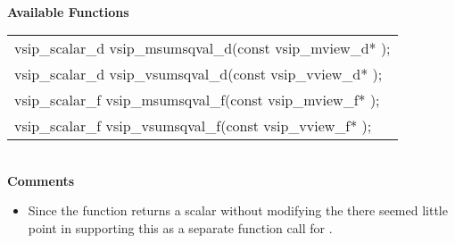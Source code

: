 \\\cvsiplh
\newline \hspace*{.8cm} \vspace*{.1cm} \textbf{Available Functions }
\newline \hspace*{1.1cm} {
\ttfamily
\begin{tabular}[H]{l}
vsip\_scalar\_d vsip\_msumsqval\_d(const vsip\_mview\_d* );\\
vsip\_scalar\_d vsip\_vsumsqval\_d(const vsip\_vview\_d* );\\
vsip\_scalar\_f vsip\_msumsqval\_f(const vsip\_mview\_f* );\\
vsip\_scalar\_f vsip\_vsumsqval\_f(const vsip\_vview\_f* );\\
\end{tabular}
}
\\\pyjvsiph
{}
\newline \hspace*{.8cm} \textbf{Comments}
\newline\hspace*{.9cm}\parbox{10.8cm}{\vspace*{.1cm}\begin{itemize}
\item{Since the  function returns a scalar without modifying the  there seemed little point in supporting this as a separate function call for \pyjv.}
\end{itemize}
}
